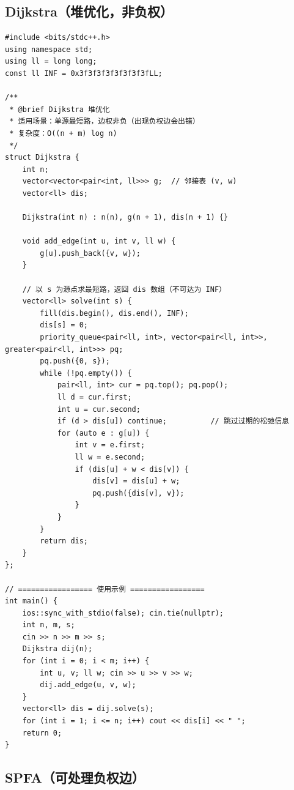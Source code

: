 \subsection{Dijkstra（堆优化，非负权）}

\begin{lstlisting}
#include <bits/stdc++.h>
using namespace std;
using ll = long long;
const ll INF = 0x3f3f3f3f3f3f3f3fLL;

/**
 * @brief Dijkstra 堆优化
 * 适用场景：单源最短路，边权非负（出现负权边会出错）
 * 复杂度：O((n + m) log n)
 */
struct Dijkstra {
    int n;
    vector<vector<pair<int, ll>>> g;  // 邻接表 (v, w)
    vector<ll> dis;

    Dijkstra(int n) : n(n), g(n + 1), dis(n + 1) {}

    void add_edge(int u, int v, ll w) {
        g[u].push_back({v, w});
    }

    // 以 s 为源点求最短路，返回 dis 数组（不可达为 INF）
    vector<ll> solve(int s) {
        fill(dis.begin(), dis.end(), INF);
        dis[s] = 0;
        priority_queue<pair<ll, int>, vector<pair<ll, int>>, greater<pair<ll, int>>> pq;
        pq.push({0, s});
        while (!pq.empty()) {
            pair<ll, int> cur = pq.top(); pq.pop();
            ll d = cur.first;
            int u = cur.second;
            if (d > dis[u]) continue;          // 跳过过期的松弛信息
            for (auto e : g[u]) {
                int v = e.first;
                ll w = e.second;
                if (dis[u] + w < dis[v]) {
                    dis[v] = dis[u] + w;
                    pq.push({dis[v], v});
                }
            }
        }
        return dis;
    }
};

// ================= 使用示例 =================
int main() {
    ios::sync_with_stdio(false); cin.tie(nullptr);
    int n, m, s;
    cin >> n >> m >> s;
    Dijkstra dij(n);
    for (int i = 0; i < m; i++) {
        int u, v; ll w; cin >> u >> v >> w;
        dij.add_edge(u, v, w);
    }
    vector<ll> dis = dij.solve(s);
    for (int i = 1; i <= n; i++) cout << dis[i] << " ";
    return 0;
}
\end{lstlisting}

\subsection{SPFA（可处理负权边）}

